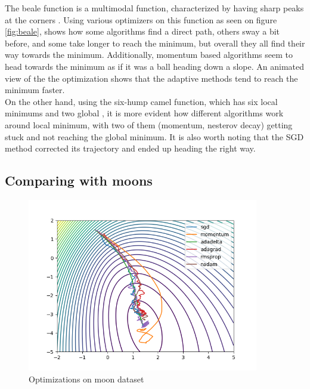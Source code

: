 \documentclass{article}
\begin{document}
The beale function is a multimodal function, characterized by having sharp peaks at the corners \cite{surjanovic_bingham_2017}. Using various optimizers on this function as seen on figure \ref{fig:beale}, shows how some algorithms find a direct path, others sway a bit before, and some take longer to reach the minimum, but overall they all find their way towards the minimum. Additionally, momentum based algorithms seem to head towards the minimum as if it was a ball heading down a slope. An animated view of the the optimization \cite{clark_2017} shows that the adaptive methods tend to reach the minimum faster.\\
On the other hand, using the six-hump camel function, which has six local minimums and two global \cite{surjanovic_bingham_2017_2}, it is more evident how different algorithms work around local minimum, with two of them (momentum, nesterov decay) getting stuck and not reaching the global minimum. It is also worth noting that the SGD method corrected its trajectory and ended up heading the right way.

\subsection{Comparing with moons}


\begin{figure}[H]
 \vspace{-10pt}
  \begin{center}
    \includegraphics[width=0.9\textwidth]{moons1.png}
  \end{center}
  \caption{Optimizations on moon dataset}
\label{fig:moon}
\end{figure}
\end{document}
